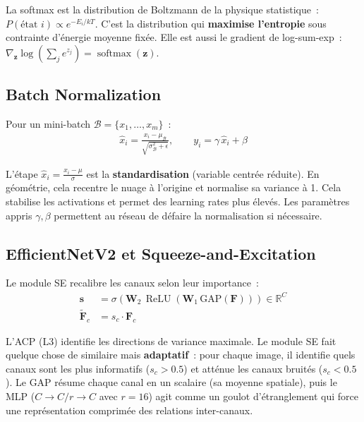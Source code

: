 \documentclass[11pt,a4paper]{article}
\newcommand{\R}{\mathbb{R}}
\DeclareMathOperator{\softmax}{softmax}
\DeclareMathOperator{\ReLU}{ReLU}
\begin{document}
\begin{rappelbox}
La softmax est la distribution de Boltzmann de la physique statistique~: $P(\text{\'etat } i) \propto e^{-E_i/kT}$. C'est la distribution qui \textbf{maximise l'entropie} sous contrainte d'\'energie moyenne fix\'ee. Elle est aussi le gradient de log-sum-exp~: $\nabla_{\mathbf{z}} \log(\sum_j e^{z_j}) = \softmax(\mathbf{z})$.
\end{rappelbox}

\subsection{Batch Normalization}

Pour un mini-batch $\mathcal{B} = \{x_1, \ldots, x_m\}$~:
\begin{align}
  \hat{x}_i = \frac{x_i - \mu_\mathcal{B}}{\sqrt{\sigma_\mathcal{B}^2 + \epsilon}}, \qquad y_i = \gamma\,\hat{x}_i + \beta
\end{align}

\begin{intubox}
L'\'etape $\hat{x}_i = \frac{x_i - \mu}{\sigma}$ est la \textbf{standardisation} (variable centr\'ee r\'eduite). En g\'eom\'etrie, cela recentre le nuage \`a l'origine et normalise sa variance \`a 1. Cela stabilise les activations et permet des learning rates plus \'elev\'es. Les param\`etres appris $\gamma, \beta$ permettent au r\'eseau de \og{}d\'efaire\fg{} la normalisation si n\'ecessaire.
\end{intubox}

\subsection{EfficientNetV2 et Squeeze-and-Excitation}

Le module SE recalibre les canaux selon leur importance~:
\begin{align}
  \mathbf{s} &= \sigma\!\left(\mathbf{W}_2\,\ReLU(\mathbf{W}_1\,\text{GAP}(\mathbf{F}))\right) \in \R^C \\
  \widetilde{\mathbf{F}}_c &= s_c \cdot \mathbf{F}_c
\end{align}

\begin{intubox}
L'ACP (L3) identifie les directions de variance maximale. Le module SE fait quelque chose de similaire mais \textbf{adaptatif}~: pour chaque image, il identifie quels canaux sont les plus informatifs ($s_c > 0.5$) et att\'enue les canaux bruit\'es ($s_c < 0.5$). Le GAP r\'esume chaque canal en un scalaire (sa moyenne spatiale), puis le MLP ($C \to C/r \to C$ avec $r=16$) agit comme un goulot d'\'etranglement qui force une repr\'esentation comprim\'ee des relations inter-canaux.
\end{intubox}
\end{document}
